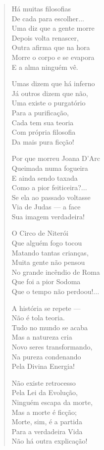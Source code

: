 \begin{verse}
Há muitas filosofias \\
De cada para escolher... \\
Uma diz que a gente morre \\
Depois volta renascer, \\
Outra afirma que na hora \\
Morre o corpo e se evapora \\
E a alma ninguém vê. 

Umas dizem que há inferno \\
Já outros dizem que não, \\
Uma existe o purgatório \\
Para a purificação, \\
Cada tem sua teoria \\
Com própria filosofia \\
Da mais pura ficção! 

Por que morreu Joana D'Arc \\
Queimada numa fogueira \\
E ainda sendo taxada \\
Como a pior feiticeira?...\\
Se ela ao passado voltasse \\
Via de Judas ---  a face \\
Sua imagem verdadeira! 


O Circo de Niterói \\
Que alguém fogo tocou \\
Matando tantas crianças, \\
Muita gente não pensou \\
No grande incêndio de Roma \\
Que foi a pior Sodoma \\
Que o tempo não perdoou!... 

A história se repete --- \\
Não é tola teoria. \\
Tudo no mundo se acaba \\
Mas a natureza cria \\
Novo seres transformando, \\
Na pureza condenando \\
Pela Divina Energia! 

Não existe retrocesso \\
Pela Lei da Evolução, \\
Ninguém escapa da morte, \\
Mas a morte é ficção; \\
Morte, sim, é a partida \\
Para a verdadeira Vida \\
Não há outra explicação! 


\end{verse}

